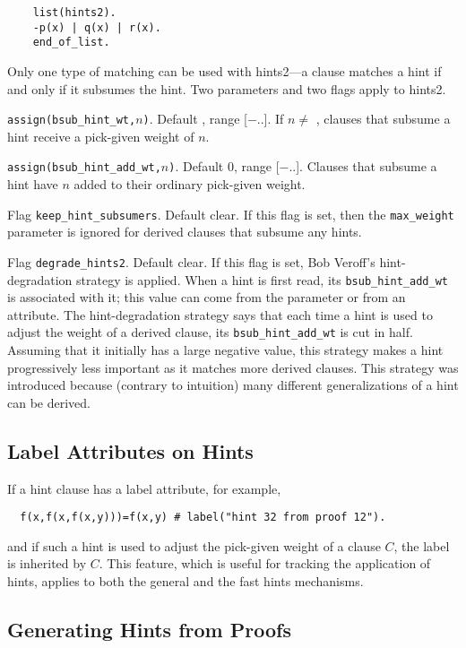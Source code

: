 \documentclass[11pt]{article}
\begin{document}
{\small
\begin{verbatim}
    list(hints2).
    -p(x) | q(x) | r(x).
    end_of_list.
\end{verbatim}
}
\noindent
Only one type of matching can be used with hints2---a clause matches
a hint if and only if it subsumes the hint.  Two parameters
and two flags apply to hints2.

\noindent
\verb:assign(bsub_hint_wt,:$n$\verb:):.  Default \maxint, range [$-$\maxint ..\maxint ].
If $n \neq$ \maxint,
clauses that subsume a hint receive a pick-given weight of $n$.

\noindent
\verb:assign(bsub_hint_add_wt,:$n$\verb:):.  Default 0, range [$-$\maxint ..\maxint ].
Clauses that subsume a hint have $n$ added to their ordinary
pick-given weight.

\noindent
Flag \verb:keep_hint_subsumers:.  Default clear.
If this flag is set, then the \verb:max_weight: parameter is
ignored for derived clauses that subsume any hints.

\noindent
Flag \verb:degrade_hints2:.  Default clear.
If this flag is set, Bob Veroff's hint-degradation strategy is applied.
When a hint is first read, its \verb:bsub_hint_add_wt: is associated
with it; this value can come from the parameter or from an attribute.
The hint-degradation strategy says that each time a hint is used
to adjust the weight of a derived clause, its \verb:bsub_hint_add_wt:
is cut in half.  Assuming that it initially has a large negative value,
this strategy makes a hint progressively less important as it matches
more derived clauses.  This strategy was introduced because
(contrary to intuition) many different generalizations of a hint
can be derived.

\subsection{Label Attributes on Hints}
If a hint clause has a label attribute, for example,
\begin{verbatim}
  f(x,f(x,f(x,y)))=f(x,y) # label("hint 32 from proof 12").
\end{verbatim}
and if such a hint is used to adjust the pick-given weight
of a clause $C$, the label is inherited by $C$.  This
feature, which is useful for tracking the application of hints,
applies to both the general and the fast hints mechanisms.

\subsection{Generating Hints from Proofs}
\end{document}
